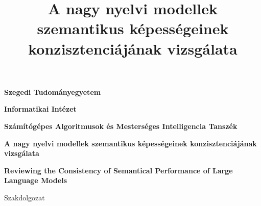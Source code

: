 \documentclass[12pt]{report}
\title{
     A nagy nyelvi modellek szemantikus képességeinek konzisztenciájának vizsgálata
}
\theoremstyle{definition}
\begin{document}

\pagestyle{fancy}
\fancyhf{}
\fancyfoot[R]{\thepage}

\thispagestyle{empty}

\begin{center}
	\vspace*{1cm}
	\begin{Large}
		\bf Szegedi Tudományegyetem
	\end{Large}

	\vspace{0.5cm}

	\begin{Large}
		\bf Informatikai Intézet
	\end{Large}

	\begin{Large}
		\bf Számítógépes Algoritmusok és Mesterséges Intelligencia Tanszék
	\end{Large}



	\vspace*{3cm}


	{\LARGE\bf \begin{Large}
		\bf
		A nagy nyelvi modellek szemantikus képességeinek konzisztenciájának vizsgálata
		\end{Large}}


	\vspace*{0.5cm}


	{\LARGE\bf \begin{Large}
		\bf
		Reviewing the Consistency of Semantical Performance of Large Language Models
		\end{Large}}

	\vspace*{2.4cm}


	{\Large Szakdolgozat}




\end{center}
\end{document}

